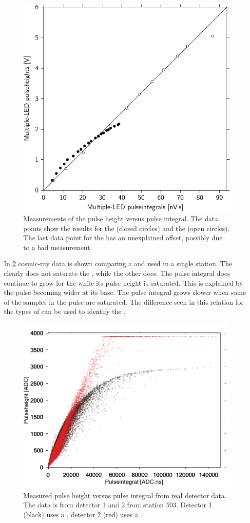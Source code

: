 \begin{figure}
    \centering
    \includegraphics[width=.7\linewidth]
                    {plots/station/ph_pi_compared_nikhef_senstech}
    \caption{Measurements of the pulse height versus pulse integral. The data points show the results for the \senstech \pmt (closed circles) and the \nikhef \pmt (open circles). The last data point for the \nikhef \pmt has an unexplained offset, possibly due to a bad measurement.}
    \label{fig:ph_pi_compared_nikhef_senstech}
\end{figure}

In \cref{fig:ph_pi_503} cosmic-ray data is shown comparing a \nikhef and \senstech \pmt used in a single station. The \senstech \pmt clearly does not saturate the \adcs, while the other does. The pulse integral does continue to grow for the \nikhef \pmt while its pulse height is saturated. This is explained by the pulse becoming wider at its base. The pulse integral grows slower when some of the samples in the pulse are saturated. The difference seen in this relation for the types of \pmts can be used to identify the \pmt.

\begin{figure}
    \centering
    \includegraphics[width=.7\textwidth]{plots/station/ph_pi_503.png}
    \caption{Measured pulse height versus pulse integral from real detector data. The data is from detector 1 and 2 from station 503. Detector 1 (black) uses a \senstech \pmt, detector 2 (red) uses a \nikhef \pmt.}
    \label{fig:ph_pi_503}
\end{figure}

